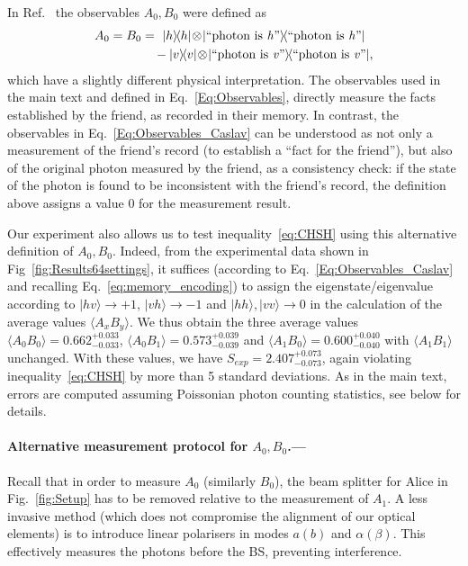 \documentclass[aps,floatfix,superscriptaddress,twocolumn,tightenlines,amsmath,amssymb,nofootinbib,10pt]{revtex4-1}
\newcommand{\ket}[1] {| #1 \rangle}
\newcommand{\ketbra}[1]{ | #1 \rangle\!\langle #1 |}
\begin{document}
In Ref.~\cite{Brukner2018} the observables $A_0, B_0$ were defined as
\begin{align}
A_0 = B_0 & = \ \ketbra{h}\!\otimes\!\ketbra{\text{``photon is \textit{h}''}} \notag \\
& \quad - \ketbra{v}\!\otimes\!\ketbra{\text{``photon is \textit{v}''}}, \label{Eq:Observables_Caslav}
\end{align}
which have a slightly different physical interpretation. The observables used in the main text and defined in Eq.~\eqref{Eq:Observables}, directly measure the facts established by the friend, as recorded in their memory. In contrast, the observables in Eq.~\eqref{Eq:Observables_Caslav} can be understood as not only a measurement of the friend's record (to establish a ``fact for the friend''), but also of the original photon measured by the friend, as a consistency check: if the state of the photon is found to be inconsistent with the friend's record, the definition above assigns a value $0$ for the measurement result.

Our experiment also allows us to test inequality~\eqref{eq:CHSH} using this alternative definition of $A_0, B_0$. Indeed, from the experimental data shown in Fig~\ref{fig:Results64settings}, it suffices (according to Eq.~\eqref{Eq:Observables_Caslav} and recalling Eq.~\eqref{eq:memory_encoding}) to assign the eigenstate/eigenvalue according to $\ket{hv} \to +1$, $\ket{vh} \to -1$ and $\ket{hh}, \ket{vv} \to 0$ in the calculation of the average values $\langle A_x B_y \rangle$.
We thus obtain the three average values $\langle A_0 B_0 \rangle = 0.662^{+0.033}_{-0.033}$, $\langle A_0 B_1 \rangle = 0.573^{+0.039}_{-0.039}$ and $\langle A_1 B_0 \rangle = 0.600^{+0.040}_{-0.040}$ with $\langle A_1 B_1 \rangle$ unchanged. With these values, we have $S_{exp} = 2.407^{+0.073}_{-0.073}$, again violating inequality~\eqref{eq:CHSH} by more than 5 standard deviations. As in the main text, errors are computed assuming Poissonian photon counting statistics, see below for details.

\bigskip
\paragraph*{Alternative measurement protocol for $A_0, B_0$.--- }
Recall that in order to measure $A_0$ (similarly $B_0$), the beam splitter for Alice in Fig.~\ref{fig:Setup} has to be removed relative to the measurement of $A_1$. A less invasive method (which does not compromise the alignment of our optical elements) is to introduce linear polarisers in modes $a (b)$ and $\alpha (\beta)$. This effectively measures the photons before the BS, preventing interference.
\end{document}
